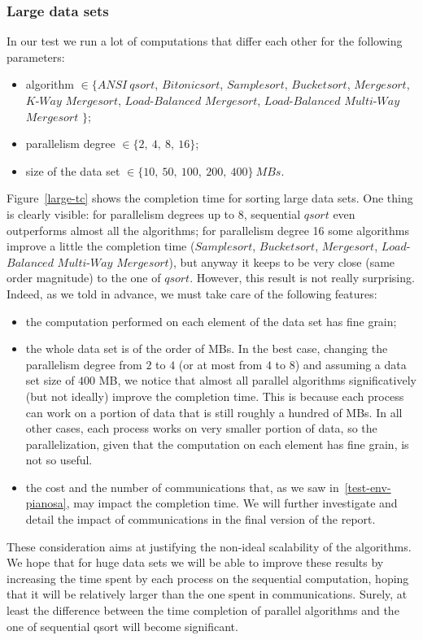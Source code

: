 \subsubsection*{Large data sets}
In our test we run a lot of computations that differ each other for the following parameters:
\begin{itemize}
\item algorithm $\in \lbrace ANSI\ qsort$, $Bitonicsort$, $Samplesort$, $Bucketsort$, $Mergesort$, $K$-$Way$ $Mergesort$, $Load$-$Balanced$ $Mergesort$, $Load$-$Balanced$ $Multi$-$Way$ $Mergesort$ $\rbrace$;
\item parallelism degree $\in \lbrace 2,\ 4,\ 8,\ 16 \rbrace$;
\item size of the data set $\in \lbrace 10,\ 50,\ 100,\ 200,\ 400 \rbrace \ MBs$.
\end{itemize} 
Figure~\ref{large-tc} shows the completion time for sorting large data sets. One thing is clearly visible: for parallelism degrees up to 8, sequential $qsort$ even outperforms almost all the algorithms; for parallelism degree 16 some algorithms improve a little the completion time ($Samplesort$, $Bucketsort$, $Mergesort$, $Load$-$Balanced$ $Multi$-$Way$ $Mergesort$), but anyway it keeps to be very close (same order magnitude) to the one of $qsort$. However, this result is not really surprising. Indeed, as we told in advance, we must take care of the following features:
\begin{itemize}
\item the computation performed on each element of the data set has fine grain;
\item the whole data set is of the order of MBs. In the best case, changing the parallelism degree from $2$ to $4$ (or at most from $4$ to $8$) and assuming a data set size of $400$ MB, we notice that almost all parallel algorithms significatively (but not ideally) improve the completion time. This is because each process can work on a portion of data that is still roughly a hundred of MBs. In all other cases, each process works on very smaller portion of data, so the parallelization, given that the computation on each element has fine grain, is not so useful. 
\item the cost and the number of communications that, as we saw in~\ref{test-env-pianosa}, may impact the completion time. We will further investigate and detail the impact of communications in the final version of the report.
\end{itemize}
These consideration aims at justifying the non-ideal scalability of the algorithms. We hope that for huge data sets we will be able to improve these results by increasing the time spent by each process on the sequential computation, hoping that it will be relatively larger than the one spent in communications. Surely, at least the difference between the time completion of parallel algorithms and the one of sequential qsort will become significant.

